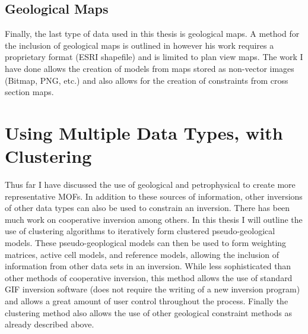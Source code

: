 \subsection{Geological Maps}
\label{sec: Geological Maps}

Finally, the last type of data used in this thesis is geological maps. A method for the inclusion of geological maps is outlined in \cite{williams2008geologically} however his work requires a proprietary format (ESRI shapefile) and is limited to plan view maps. The work I have done allows the creation of models from maps stored as non-vector images (Bitmap, PNG, etc.) and also allows for the creation of constraints from cross section maps.


\section{Using Multiple Data Types, with Clustering}
\label{sec:Using Multiple Data Types, with Clustering}

Thus far I have discussed the use of geological and petrophysical to create more representative \ac{MOF}s. In addition to these sources of information, other inversions of other data types can also be used to constrain an inversion. There has been much work on cooperative inversion \cite{sun2012joint} among others. In this thesis I will outline the use of clustering algorithms to iteratively form clustered pseudo-geological models. These pseudo-geoplogical models can then be used to form weighting matrices, active cell models, and reference models, allowing the inclusion of information from other data sets in an inversion. While less sophisticated than other methods of cooperative inversion, this method allows the use of standard GIF inversion software (does not require the writing of a new inversion program) and allows a great amount of user control throughout the process. Finally the clustering method also allows the use of other geological constraint methods as already described above.


\endinput

 Interestingly, the assumption that all magnetizations are in the same direction also assumes that all Koenigsberger ratios are equal.

Any text after an \endinput is ignored.
You could put scraps here or things in progress.
